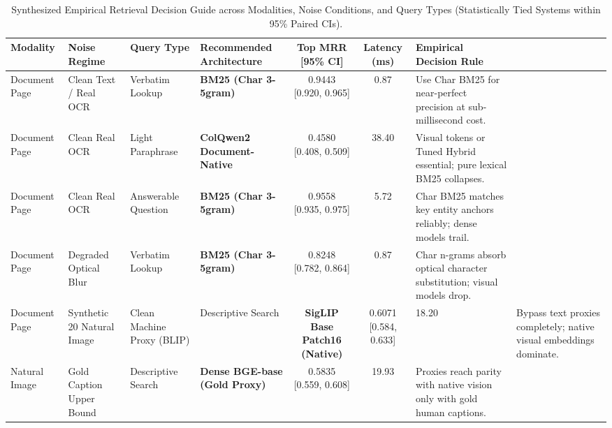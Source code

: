 \begin{table}[t]
\centering
\small
\caption{Synthesized Empirical Retrieval Decision Guide across Modalities, Noise Conditions, and Query Types (Statistically Tied Systems within 95\% Paired CIs).}
\label{tab:decision_guide}
\begin{tabular}{llllccl}
\toprule
Modality & Noise Regime & Query Type & Recommended Architecture & Top MRR [95\% CI] & Latency (ms) & Empirical Decision Rule \\
\midrule
Document Page & Clean Text / Real OCR & Verbatim Lookup & \textbf{BM25 (Char 3-5gram)} & 0.9443 [0.920, 0.965] & 0.87 & Use Char BM25 for near-perfect precision at sub-millisecond cost. \\
Document Page & Clean Real OCR & Light Paraphrase & \textbf{ColQwen2 Document-Native} & 0.4580 [0.408, 0.509] & 38.40 & Visual tokens or Tuned Hybrid essential; pure lexical BM25 collapses. \\
Document Page & Clean Real OCR & Answerable Question & \textbf{BM25 (Char 3-5gram)} & 0.9558 [0.935, 0.975] & 5.72 & Char BM25 matches key entity anchors reliably; dense models trail. \\
Document Page & Degraded Optical Blur & Verbatim Lookup & \textbf{BM25 (Char 3-5gram)} & 0.8248 [0.782, 0.864] & 0.87 & Char n-grams absorb optical character substitution; visual models drop. \\
Document Page & Synthetic 20%
Natural Image & Clean Machine Proxy (BLIP) & Descriptive Search & \textbf{SigLIP Base Patch16 (Native)} & 0.6071 [0.584, 0.633] & 18.20 & Bypass text proxies completely; native visual embeddings dominate. \\
Natural Image & Gold Caption Upper Bound & Descriptive Search & \textbf{Dense BGE-base (Gold Proxy)} & 0.5835 [0.559, 0.608] & 19.93 & Proxies reach parity with native vision only with gold human captions. \\
\bottomrule
\end{tabular}
\end{table}

